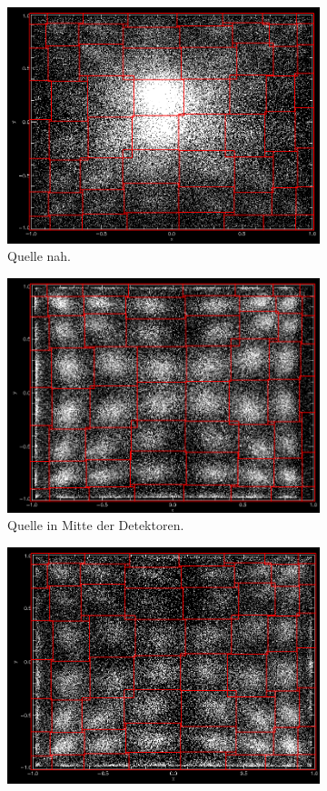 \documentclass[slug=PET, room=Andreas-Schubert-Bau\,\ 424A, supervisor=Carsten\ Bittrich, coursedate=10.\ 01.\ 2020]{../../Lab_Report_LaTeX/lab_report}
\begin{document}
\begin{figure}[h!]
	\centering
	\begin{subfigure}{0.32\textwidth}
		\centering
		\includegraphics[width=.9\textwidth]{../messungen/kalib/vergleich_mitte_nah_NAH.png}
		\caption{Quelle nah.}
	\end{subfigure}
	\begin{subfigure}{0.32\textwidth}
		\centering
		\includegraphics[width=.9\textwidth]{../messungen/kalib/vergleich_mitte_nah_MITTE.png}
		\caption{Quelle in Mitte der Detektoren.}
	\end{subfigure}
	\begin{subfigure}{0.32\textwidth}
		\centering
		\includegraphics[width=.9\textwidth]{../messungen/kalib/vergleich_mitte_fern_FERN.png}

\end{subfigure}
\end{figure}
\end{document}
